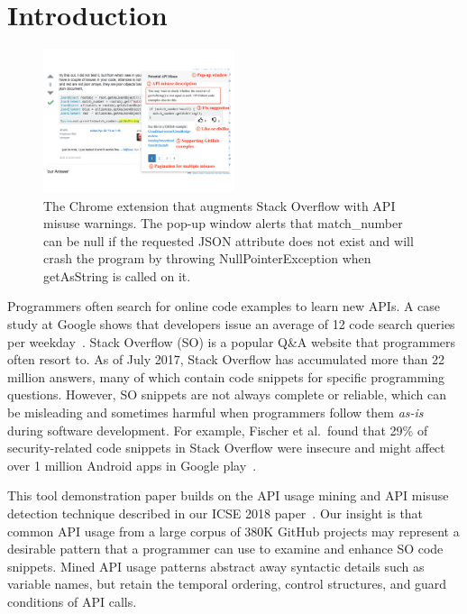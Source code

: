 \section{Introduction}
\label{sec:intro}

\begin{figure}
\centering
\includegraphics[width=0.5\textwidth]{examplecheck-screenshot.pdf}
  \caption{The {\tool} Chrome extension that augments Stack Overflow with API misuse warnings. The pop-up window alerts that {\ttt match\_number} can be {\ttt null} if the requested {\ttt JSON} attribute does not exist and will crash the program by throwing {\ttt NullPointerException} when {\ttt getAsString} is called on it.}
  \label{fig:screenshot}
  \vspace{-0.1in}
\end{figure}

Programmers often search for online code examples to learn new APIs. A case study at Google shows that developers issue an average of 12 code search queries per weekday~\cite{sadowski2015developers}. Stack Overflow (SO) is a popular Q\&A website that programmers often resort to. As of July 2017, Stack Overflow has accumulated more than 22 million answers, many of which contain code snippets for specific programming questions. However, SO snippets are not always complete or reliable, which can be misleading and sometimes harmful when programmers follow them {\em as-is} during software development. For example, Fischer et al.~found that 29\% of security-related code snippets in Stack Overflow were insecure and might affect over 1 million Android apps in Google play~\cite{fischer2017stack}. 

This tool demonstration paper builds on the API usage mining and API misuse detection technique described in our ICSE 2018 paper~\cite{zhang2018code}. Our insight is that common API usage from a large corpus of 380K GitHub projects may represent a desirable pattern that a programmer can use to examine and enhance SO code snippets. Mined API usage patterns abstract away syntactic details such as variable names, but retain the temporal ordering, control structures, and guard conditions of API calls. 

